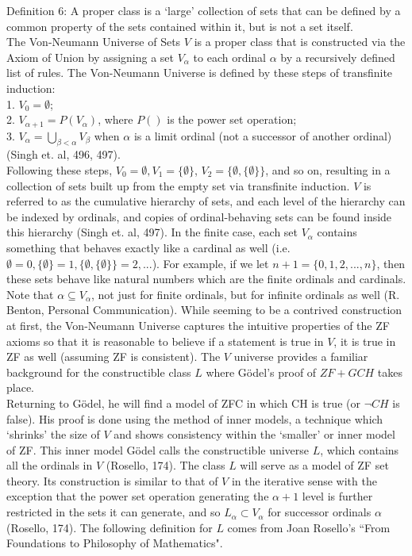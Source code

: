 \documentclass[10pt,letterpaper]{amsart}
\numberwithin{equation}{section}
\theoremstyle{plain}
\theoremstyle{definition}
\numberwithin{equation}{section}
\begin{document}
\noindent Definition 6: A proper class is a `large' collection of sets that can be defined by a common property of the sets contained within it, but is not a set itself. \\ 

The Von-Neumann Universe of Sets $V$ is a proper class that is constructed via the Axiom of Union by assigning a set $V_\alpha$ to each ordinal $\alpha$ by a recursively defined list of rules. The Von-Neumann Universe is defined by these steps of transfinite induction:\\
1. $V_0=\emptyset$; \\
2. $V_{\alpha+1}=P(V_\alpha)$, where $P()$ is the power set operation; \\
3. $V_\alpha=\bigcup_{\beta < \alpha} V_\beta$ when $\alpha$ is a limit ordinal (not a successor of another ordinal) (Singh et. al, 496, 497). \\

Following these steps, $V_0=\emptyset, V_1=\{ \emptyset \}$, $V_2=\{ \emptyset, \{ \emptyset \} \}$, and so on, resulting in a collection of sets built up from the empty set via transfinite induction. $V$ is referred to as the cumulative hierarchy of sets, and each level of the hierarchy can be indexed by ordinals, and copies of ordinal-behaving sets can be found inside this hierarchy (Singh et. al, 497). In the finite case, each set $V_\alpha$ contains something that behaves exactly like a cardinal as well (i.e. $\emptyset = 0, \{ \emptyset \}=1, \{ \emptyset, \{ \emptyset \} \}=2,... $). For example, if we let $n+1=\{ 0,1,2,...,n\}$, then these sets behave like natural numbers which are the finite ordinals and cardinals. Note that $\alpha \subseteq V_\alpha$, not just for finite ordinals, but for infinite ordinals as well (R. Benton, Personal Communication). While seeming to be a contrived construction at first, the Von-Neumann Universe captures the intuitive properties of the ZF axioms so that it is reasonable to believe if a statement is true in $V$, it is true in ZF as well (assuming ZF is consistent). The $V$ universe provides a familiar background for the constructible class $L$ where Gödel's proof of $ZF+GCH$ takes place.  \\

Returning to Gödel, he will find a model of ZFC in which CH is true (or $\neg CH$ is false). His proof is done using the method of inner models, a technique which `shrinks' the size of $V$ and shows consistency within the `smaller' or inner model of ZF. This inner model Gödel calls the constructible universe $L$, which contains all the ordinals in $V$ (Rosello, 174). The class $L$ will serve as a model of ZF set theory. Its construction is similar to that of $V$ in the iterative sense with the exception that the power set operation generating the $\alpha+1$ level is further restricted in the sets it can generate, and so $L_\alpha \subset V_\alpha$ for successor ordinals $\alpha$ (Rosello, 174). The following definition for $L$ comes from Joan Rosello's ``From Foundations to Philosophy of Mathematics". \\
\end{document}
